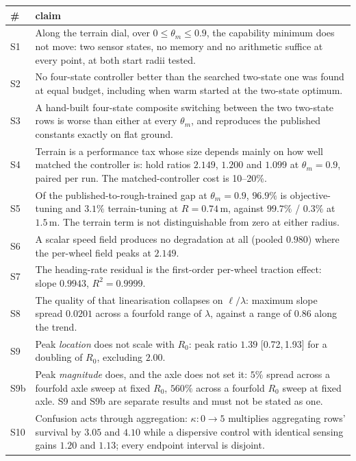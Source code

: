 \documentclass[11pt,a4paper]{article}
\newcommand{\CI}[2]{[#1,\,#2]}
\begin{document}
\begin{longtable}{p{}p{}}
\toprule
\# & claim \\
\midrule
\endhead
S1 & Along the terrain dial, over $0 \le \theta_m \le 0.9$, the capability minimum does not move: two sensor states, no memory and no arithmetic suffice at every point, at both start radii tested. \\
S2 & No four-state controller better than the searched two-state one was found at equal budget, including when warm started at the two-state optimum. \\
S3 & A hand-built four-state composite switching between the two two-state rows is worse than either at every $\theta_m$, and reproduces the published constants exactly on flat ground. \\
S4 & Terrain is a performance tax whose size depends mainly on how well matched the controller is: hold ratios $2.149$, $1.200$ and $1.099$ at $\theta_m = 0.9$, paired per run. The matched-controller cost is 10--20\%. \\
S5 & Of the published-to-rough-trained gap at $\theta_m = 0.9$, $96.9\%$ is objective-tuning and $3.1\%$ terrain-tuning at $R = 0.74$\,m, against $99.7\%$ / $0.3\%$ at $1.5$\,m. The terrain term is not distinguishable from zero at either radius. \\
S6 & A scalar speed field produces no degradation at all (pooled $0.980$) where the per-wheel field peaks at $2.149$. \\
S7 & The heading-rate residual is the first-order per-wheel traction effect: slope $0.9943$, $R^2 = 0.9999$. \\
S8 & The quality of that linearisation collapses on $\ell/\lambda$: maximum slope spread $0.0201$ across a fourfold range of $\lambda$, against a range of $0.86$ along the trend. \\
S9 & Peak \emph{location} does not scale with $R_0$: peak ratio $1.39$ \CI{0.72}{1.93} for a doubling of $R_0$, excluding $2.00$. \\
S9b & Peak \emph{magnitude} does, and the axle does not set it: $5\%$ spread across a fourfold axle sweep at fixed $R_0$, $560\%$ across a fourfold $R_0$ sweep at fixed axle. S9 and S9b are separate results and must not be stated as one. \\
S10 & Confusion acts through aggregation: $\kappa: 0 \to 5$ multiplies aggregating rows' survival by $3.05$ and $4.10$ while a dispersive control with identical sensing gains $1.20$ and $1.13$; every endpoint interval is disjoint. \\

\end{longtable}
\end{document}
